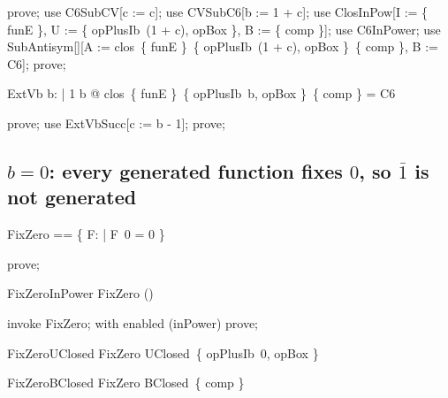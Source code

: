 \documentclass{article}
\begin{document}
\begin{zproof}
prove;
use C6SubCV[c := c];
use CVSubC6[b := 1 + c];
use ClosInPow[I := \{ funE \}, U := \{ opPlusIb~(1 + c), opBox \}, B := \{ comp \}];
use C6InPower;
use SubAntisym[\nat \fun \nat][A := clos~\{ funE \}~\{ opPlusIb~(1 + c), opBox \}~\{ comp \}, B := C6];
prove;
\end{zproof}

\begin{theorem}{ExtVb}
  \forall b: \nat | 1 \leq b @ clos~\{ funE \}~\{ opPlusIb~b, opBox \}~\{ comp \} = C6
\end{theorem}

\begin{zproof}
prove;
use ExtVbSucc[c := b - 1];
prove;
\end{zproof}

\subsection{$b = 0$: every generated function fixes $0$, so $\bar 1$ is not generated}

\begin{zed}
  FixZero == \{ F: \nat \fun \nat | F~0 = 0 \}
\end{zed}

\begin{zproof}
prove;
\end{zproof}

\begin{theorem}{FixZeroInPower}
  FixZero \in \power (\nat \fun \nat)
\end{theorem}

\begin{zproof}
invoke FixZero;
with enabled (inPower) prove;
\end{zproof}

\begin{theorem}{FixZeroUClosed}
  FixZero \in UClosed~\{ opPlusIb~0, opBox \}
\end{theorem}


\begin{theorem}{FixZeroBClosed}
  FixZero \in BClosed~\{ comp \}
\end{theorem}
\end{document}
